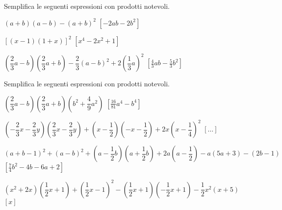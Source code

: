 \begin{esercizio}[\Ast]
 \label{ese:11.22}
Semplifica le seguenti espressioni con prodotti notevoli.

 \begin{enumeratea}
 \item \((a+b)(a-b)-(a+b)^{2}\)
  \hfill \(\left[-2{ab}-2b^{2}\right]\)
 \item \([(x-1)(1+x)]^{2}\)
  \hfill \(\left[x^{4}-2x^{2}+1\right]\)
 \item 
\(\left(\dfrac{2}{3}a-b\right)\left(\dfrac{2}{3}a+b\right)-\dfrac{2}{3}(a-b)^{2}
+2\left(\dfrac{1}{3}a\right)^{2}\)
  \hfill \(\left[\frac{4}{3}{ab}-\frac{5}{3}b^{2}\right]\)
%  
% 
%  
% 
 \end{enumeratea}
\end{esercizio}

\begin{esercizio}[\Ast]
 \label{ese:11.23}
Semplifica le seguenti espressioni con prodotti notevoli.

 \begin{enumeratea}
 \item \(\left(\dfrac{2}{3}a-b\right)\left(\dfrac{2}{3}a+b\right)
        \left(b^{2}+\dfrac{4}{9}a^{2}\right)\)
  \hfill \(\left[\frac{16}{81}a^{4}-b^{4}\right]\)
 \item \(\left(-{\dfrac{2}{3}x-\dfrac{2}{3}y}\right)
        \left(\dfrac{2}{3}x-\dfrac{2}{3}y\right)+\left(x-\dfrac{1}{2}\right)
        \left(-x-\dfrac{1}{2}\right)+2x\left(x-\dfrac{1}{4}\right)^{2}\)
  \hfill \(\left[ \dots \right]\)
 \item \((a+b-1)^{2}+(a-b)^{2}+\left(a-\dfrac{1}{2}b\right)
        \left(a+\dfrac{1}{2}b\right)+2a\left(a-\dfrac{1}{2}\right)-
        a(5a+3)-(2b-1)\)
  \hfill \(\left[\frac{7}{4}b^{2}-4b-6a+2\right]\)
 \item \(\left(x^{2}+2x\right)
        \left(\dfrac{1}{2}x+1\right)+\left(\dfrac{1}{2}x-1\right)^{2}-
        \left(\dfrac{1}{2}x+1\right)
        \left(-{\dfrac{1}{2}}x+1\right)-\dfrac{1}{2}x^{2}(x+5)\)
  \hfill \(\left[x\right]\)
\end{enumeratea}
\end{esercizio}

